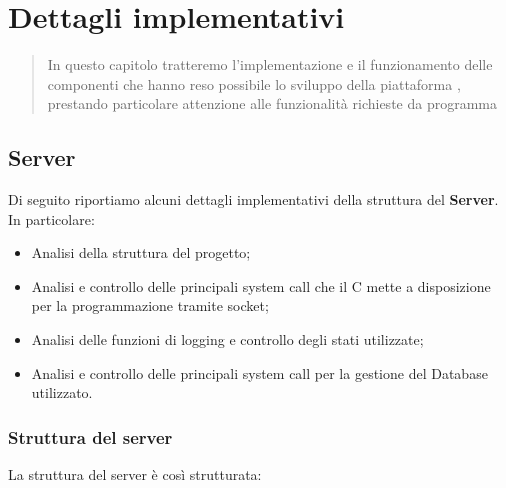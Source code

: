 \chapter{Dettagli implementativi}
  \begin{abstract}
    In questo capitolo tratteremo l'implementazione e il funzionamento delle componenti che hanno reso possibile lo sviluppo della piattaforma , prestando particolare attenzione alle funzionalità richieste da programma
  \end{abstract}
  \section{Server}
    Di seguito riportiamo alcuni dettagli implementativi della struttura del \textbf{Server}. In particolare:

    \begin{itemize}
      \item Analisi della struttura del progetto;
      \item Analisi e controllo delle principali system call che il C mette a disposizione per la programmazione tramite socket\footnotemark; 
      \item Analisi delle funzioni di logging e controllo degli stati utilizzate;
      \item Analisi e controllo delle principali system call per la gestione del Database utilizzato.
    \end{itemize}

    \subsection{Struttura del server}
    La struttura del server è così strutturata:


